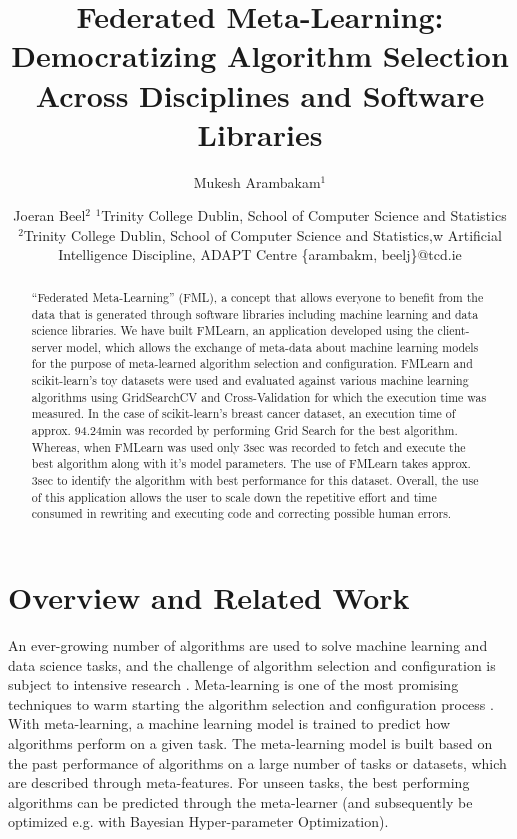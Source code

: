 \documentclass{article}
\title{Federated Meta-Learning: Democratizing Algorithm Selection Across Disciplines and Software Libraries}
\author{
Mukesh Arambakam$^1$
\and
Joeran Beel$^2$
\affiliations
$^1$Trinity College Dublin,
School of Computer Science and Statistics\\
$^2$Trinity College Dublin,
School of Computer Science and Statistics,w
Artificial Intelligence Discipline,
ADAPT Centre
\emails
\{arambakm, beelj\}@tcd.ie
}
\begin{document}
\maketitle

\begin{abstract}
“Federated Meta-Learning” (FML), a concept that allows everyone to benefit from the data that is generated through software libraries including machine learning and data science libraries. We have built FMLearn, an application developed using the client-server model, which allows the exchange of meta-data about machine learning models for the purpose of meta-learned algorithm selection and configuration. FMLearn and scikit-learn’s toy datasets were used and evaluated against various machine learning algorithms using GridSearchCV and Cross-Validation for which the execution time was measured. In the case of scikit-learn’s breast cancer dataset, an execution time of approx. 94.24min was recorded by performing Grid Search for the best algorithm. Whereas, when FMLearn was used only 3sec was recorded to fetch and execute the best algorithm along with it's model parameters. The use of FMLearn takes approx. 3sec to identify the algorithm with best performance for this dataset. Overall, the use of this application allows the user to scale down the repetitive effort and time consumed in rewriting and executing code and correcting possible human errors.
\end{abstract}

\section{Overview and Related Work}
An ever-growing number of algorithms are used to solve machine learning and data science tasks, and the challenge of algorithm selection and configuration is subject to intensive research \cite{bischl-et-al,brazdil:p,calandra-et-al,collins-et-al2018,romero-et-al,vartak-et-al}. Meta-learning is one of the most promising techniques to warm starting the algorithm selection and configuration process \cite{hutter-et-al}. With meta-learning, a machine learning model is trained to predict how algorithms perform on a given task. The meta-learning model is built based on the past performance of algorithms on a large number of tasks or datasets, which are described through meta-features. For unseen tasks, the best performing algorithms can be predicted through the meta-learner (and subsequently be optimized e.g. with Bayesian Hyper-parameter Optimization).
\end{document}
